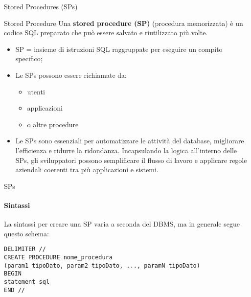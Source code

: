 \begin{frame}[fragile]{Stored Procedures (SPs)}
\vspace{-.7cm}
\begin{minipage}{.85\textwidth}
\begin{block}{Stored Procedure}
Una \textbf{stored procedure (SP)} (procedura memorizzata) \`e un codice SQL preparato che pu\`o essere salvato e riutilizzato pi\`u volte.
\end{block}
\end{minipage}

\vspace{.2cm}

\begin{itemize}[<+->]
    \item SP = insieme di istruzioni SQL raggruppate per eseguire un compito specifico;
    \item Le SPs possono essere richiamate da:
        \begin{itemize}
            \item utenti
            \item applicazioni
            \item o altre procedure
        \end{itemize}
        \item Le SPs sono essenziali per automatizzare le attivit\`a del database, migliorare l'efficienza e ridurre la ridondanza.
        Incapsulando la logica all'interno delle SPs, gli sviluppatori possono semplificare il flusso di lavoro e applicare regole aziendali coerenti tra pi\`u applicazioni e sistemi.
\end{itemize}
\end{frame}
%
\begin{frame}[fragile]{SPs}
\framesubtitle{Sintassi}
\vspace{-1cm}
La sintassi per creare una SP varia a seconda del DBMS, ma in generale segue questo schema:

\begin{lstlisting}
DELIMITER //
CREATE PROCEDURE nome_procedura
(param1 tipoDato, param2 tipoDato, ..., paramN tipoDato)
BEGIN
statement_sql
END //
\end{lstlisting}
\end{frame}
%
